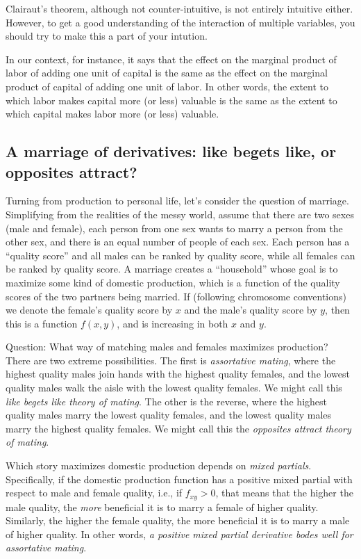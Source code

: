 \documentclass[10pt]{amsart}
\begin{document}
Clairaut's theorem, although not counter-intuitive, is not entirely
intuitive either. However, to get a good understanding of the
interaction of multiple variables, you should try to make this a part
of your intution.

In our context, for instance, it says that the effect on the marginal
product of labor of adding one unit of capital is the same as the
effect on the marginal product of capital of adding one unit of
labor. In other words, the extent to which labor makes capital more
(or less) valuable is the same as the extent to which capital makes
labor more (or less) valuable.

\subsection{A marriage of derivatives: like begets like, or opposites attract?}

Turning from production to personal life, let's consider the question
of marriage. Simplifying from the realities of the messy world, assume
that there are two sexes (male and female), each person from one sex
wants to marry a person from the other sex, and there is an equal
number of people of each sex. Each person has a ``quality score'' and
all males can be ranked by quality score, while all females can be
ranked by quality score. A marriage creates a ``household'' whose goal
is to maximize some kind of domestic production, which is a function
of the quality scores of the two partners being married. If (following
chromosome conventions) we denote the female's quality score by $x$ and
the male's quality score by $y$, then this is a function $f(x,y)$, and
is increasing in both $x$ and $y$.

Question: What way of matching males and females maximizes production?
There are two extreme possibilities. The first is {\em assortative
mating}, where the highest quality males join hands with the highest
quality females, and the lowest quality males walk the aisle with the
lowest quality females. We might call this {\em like begets like
theory of mating}. The other is the reverse, where the highest quality
males marry the lowest quality females, and the lowest quality males
marry the highest quality females. We might call this the {\em
opposites attract theory of mating}.

Which story maximizes domestic production depends on {\em mixed
partials}. Specifically, if the domestic production function has a
positive mixed partial with respect to male and female quality, i.e.,
if $f_{xy} > 0$, that means that the higher the male quality, the {\em
more} beneficial it is to marry a female of higher quality. Similarly,
the higher the female quality, the more beneficial it is to marry a
male of higher quality. In other words, {\em a positive mixed partial
derivative bodes well for assortative mating}.
\end{document}
